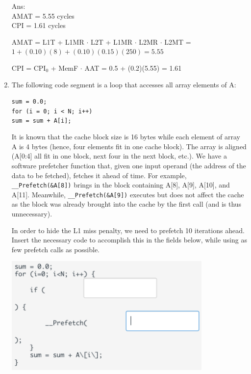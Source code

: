 \documentclass[12pt]{article}
\begin{document}
\begin{enumerate}
        Ans:\\
        AMAT = 5.55 cycles\\
        CPI = 1.61 cycles

        AMAT = L1T + L1MR $\cdot$ L2T + L1MR $\cdot$ L2MR $\cdot$ L2MT = $1 + (0.10)(8) + (0.10)(0.15)(250) = 5.55$

        CPI = CPI$_0$ + MemF $\cdot$ AAT = 0.5 + (0.2)(5.55) = 1.61

        \item The following code segment is a loop that accesses all array elements of A:
        
        \texttt{sum = 0.0;}\\
        \texttt{for (i = 0; i < N; i++)}\\
        \texttt{sum = sum + A[i];}

        It is known that the cache block size is 16 bytes while each element of array A is 4 bytes (hence, four elements 
        fit in one cache block). The array is aligned (A[0:4] all fit in one block, next four in the next block, etc.). 
        We have a software prefetcher function that, given one input operand (the address of the data to be fetched), 
        fetches it ahead of time. For example, \texttt{\_\_Prefetch(\&A[8])} brings in the block containing A[8], A[9], A[10], 
        and A[11]. Meanwhile, \texttt{\_\_Prefetch(\&A[9])} executes but does not affect the cache as the block was already 
        brought into the cache by the first call (and is thus unnecessary).

        In order to hide the L1 miss penalty, we need to prefetch 10 iterations ahead. Insert the necessary code to 
        accomplish this in the fields below, while using as few prefetch calls as possible.

        \begin{center}
            \includegraphics{assets/prefetch-code.png}
        \end{center}


\end{enumerate}
\end{document}
